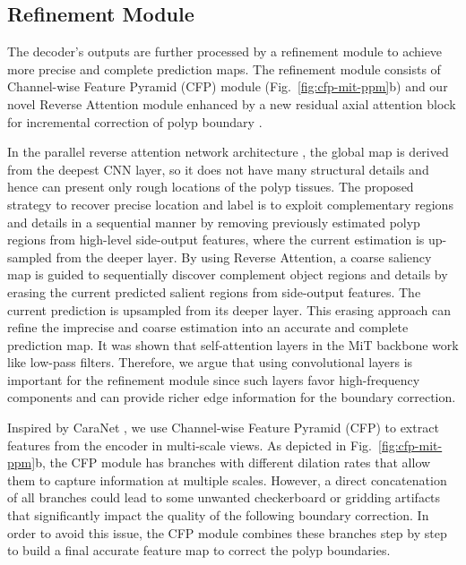 \documentclass{article}
\begin{document}
{\subsection{Refinement Module}
\label{sec:refinement_module}
The decoder's outputs are further processed by a refinement module to achieve more precise and complete prediction maps. The refinement module consists of Channel-wise Feature Pyramid (CFP) module \cite{cfpnet} (Fig.~\ref{fig:cfp-mit-ppm}b) and our novel  Reverse Attention module enhanced by a new residual axial attention block for incremental correction of polyp boundary \cite{ra, aa}.

In the parallel reverse attention network architecture \cite{pranet}, the global map is derived from the deepest CNN layer, so it does not have many structural details and hence can present only rough locations of the polyp tissues. The proposed strategy to recover precise location and label is to exploit complementary regions and details in a sequential manner by removing previously estimated polyp regions from high-level side-output features, where the current estimation is up-sampled from the deeper layer. By using Reverse Attention, a coarse saliency map is guided to sequentially discover complement object regions and details by erasing the current predicted salient regions from side-output features. The current prediction is upsampled from its deeper layer. This erasing approach can refine the imprecise and coarse estimation into an accurate and complete prediction map.
It was shown that self-attention layers in the MiT backbone work like low-pass filters. Therefore, we argue that using convolutional layers is important for the refinement module since such layers favor high-frequency components and can provide richer edge information for the boundary correction.

Inspired by CaraNet \cite{caranet}, we use Channel-wise Feature Pyramid (CFP) to extract features from the encoder in multi-scale views. As depicted in Fig.~\ref{fig:cfp-mit-ppm}b, the CFP module has  branches with different dilation rates that allow them to capture information at multiple scales. However, a direct concatenation of all branches could lead to some unwanted checkerboard or gridding artifacts that significantly impact the quality of the following boundary correction. In order to avoid this issue, the CFP module combines these branches step by step to build a final accurate feature map to correct the polyp boundaries.  

}
\end{document}

